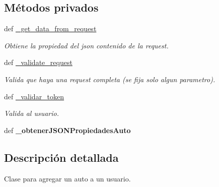 \subsection*{Métodos privados}
\begin{DoxyCompactItemize}
\item 
def \hyperlink{classsrc_1_1resources_1_1agregar_auto_usuario_1_1_agregar_auto_usuario_aef3d46a2434c1b8529ec3ff213d67b90}{\-\_\-get\-\_\-data\-\_\-from\-\_\-request}
\begin{DoxyCompactList}\small\item\em Obtiene la propiedad del json contenido de la request. \end{DoxyCompactList}\item 
def \hyperlink{classsrc_1_1resources_1_1agregar_auto_usuario_1_1_agregar_auto_usuario_ab5ea45024086cb5f15f0202f2289222c}{\-\_\-validate\-\_\-request}
\begin{DoxyCompactList}\small\item\em Valida que haya una request completa (se fija solo algun parametro). \end{DoxyCompactList}\item 
def \hyperlink{classsrc_1_1resources_1_1agregar_auto_usuario_1_1_agregar_auto_usuario_aac280b9aeeb811c61fb93540f253c7fa}{\-\_\-validar\-\_\-token}
\begin{DoxyCompactList}\small\item\em Valida al usuario. \end{DoxyCompactList}\item 
\hypertarget{classsrc_1_1resources_1_1agregar_auto_usuario_1_1_agregar_auto_usuario_a3d9a48144164751815316052e34bfdc0}{def {\bfseries \-\_\-obtener\-J\-S\-O\-N\-Propiedades\-Auto}}\label{classsrc_1_1resources_1_1agregar_auto_usuario_1_1_agregar_auto_usuario_a3d9a48144164751815316052e34bfdc0}

\end{DoxyCompactItemize}


\subsection{Descripción detallada}
Clase para agregar un auto a un usuario. 




